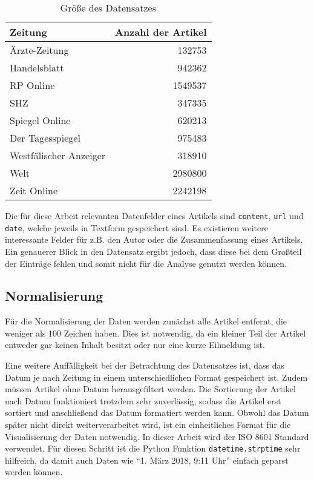 \begin{table}[h]
\centering
\begin{spacing}{1.25}
\begin{tabular}[t]{lr}
\toprule
Zeitung & Anzahl der Artikel \\
\midrule
Ärzte-Zeitung & 132753 \\
Handelsblatt & 942362 \\
RP Online & 1549537 \\
SHZ & 347335 \\
Spiegel Online & 620213 \\
Der Tagesspiegel & 975483 \\
Westfälischer Anzeiger & 318910 \\
Welt & 2980800 \\
Zeit Online & 2242198 \\
\bottomrule
\end{tabular}
\caption{Größe des Datensatzes}
\label{table.data}
\end{spacing}
\end{table}

Die für diese Arbeit relevanten Datenfelder eines Artikels sind \texttt{content}, \texttt{url} und \texttt{date}, welche jeweils in Textform gespeichert sind. Es existieren weitere interessante Felder für z.B. den Autor oder die Zusammenfassung eines Artikels. Ein genauerer Blick in den Datensatz ergibt jedoch, dass diese bei dem Großteil der Einträge fehlen und somit nicht für die Analyse genutzt werden können.

\subsection{Normalisierung}
Für die Normalisierung der Daten werden zunächst alle Artikel entfernt, die weniger als 100 Zeichen haben. Dies ist notwendig, da ein kleiner Teil der Artikel entweder gar keinen Inhalt besitzt oder nur eine kurze Eilmeldung ist.

Eine weitere Auffälligkeit bei der Betrachtung des Datensatzes ist, dass das Datum je nach Zeitung in einem unterschiedlichen Format gespeichert ist. Zudem müssen Artikel ohne Datum herausgefiltert werden. Die Sortierung der Artikel nach Datum funktioniert trotzdem sehr zuverlässig, sodass die Artikel erst sortiert und anschließend das Datum formatiert werden kann. Obwohl das Datum später nicht direkt weiterverarbeitet wird, ist ein einheitliches Format für die Visualisierung der Daten notwendig. In dieser Arbeit wird der ISO 8601 Standard verwendet. Für diesen Schritt ist die Python Funktion \texttt{datetime.strptime} sehr hilfreich, da damit auch Daten wie "`1. März 2018, 9:11 Uhr"' einfach geparst werden können.


